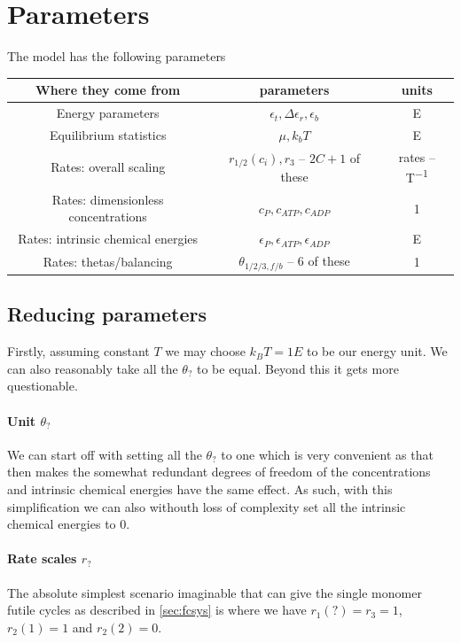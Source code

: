 \documentclass[11pt]{article}
\begin{document}
\section{Parameters}
The model has the following parameters
\begin{table}[H]
    \centering
    \begin{tabular}{c|c|c}
        Where they come from & parameters & units \\
        \hline
        Energy parameters & $\epsilon_t, \Delta\epsilon_r, \epsilon_b$ & \si{E} \\
        Equilibrium statistics & $\mu, \si{k_b}T$ & \si{E} \\
        Rates: overall scaling & $r_{1/2}(c_i),r_3$ -- $2C+1$ of these & rates -- \si{T^{-1}} \\
        Rates: dimensionless concentrations & $c_P,c_{ATP},c_{ADP}$ & \si{1} \\
        Rates: intrinsic chemical energies & $\epsilon_P,\epsilon_{ATP},\epsilon_{ADP}$ & \si{E} \\
        Rates: thetas/balancing & $\theta_{1/2/3,f/b}$ -- 6 of these & \si{1} \\
    \end{tabular}
\end{table}

\subsection{Reducing parameters}
Firstly, assuming constant $T$ we may choose $\si{k_B}T = 1\si{E}$ to be our energy unit.
We can also reasonably take all the $\theta_?$ to be equal.
Beyond this it gets more questionable.

\paragraph{Unit $\theta_?$}
We can start off with setting all the $\theta_?$ to one which is very convenient as that then makes the somewhat redundant degrees of freedom of the concentrations and intrinsic chemical energies have the same effect.
As such, with this simplification we can also withouth loss of complexity set all the intrinsic chemical energies to 0.

\paragraph{Rate scales $r_?$}
The absolute simplest scenario imaginable that can give the single monomer futile cycles as described in \cref{sec:fcsys} is where we have $r_1(?)=r_3=1$, $r_2(1)=1$ and $r_2(2)=0$.
\end{document}
